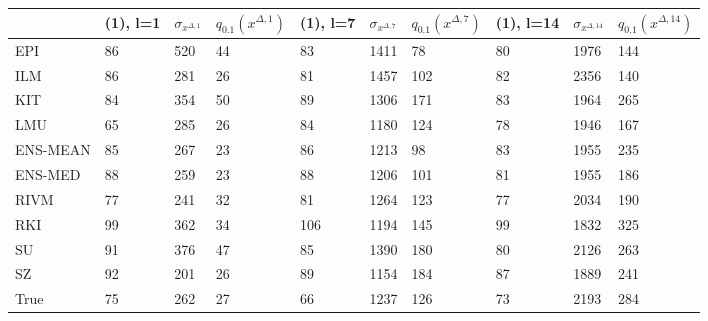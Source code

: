 \begin{tabularx}{\textwidth}{Xlllllllll}
\toprule
 & (1), l=1 & $\sigma_{x^{\Delta, 1}}$ & $q_{0.1} (x^{\Delta, 1})$ & (1), l=7 & $\sigma_{x^{\Delta, 7}}$ & $q_{0.1} (x^{\Delta, 7})$ & (1), l=14 & $\sigma_{x^{\Delta, 14}}$ & $q_{0.1} (x^{\Delta, 14})$ \\
\midrule
EPI & 86 & 520 & 44 & 83 & 1411 & 78 & 80 & 1976 & 144 \\
ILM & 86 & 281 & 26 & 81 & 1457 & 102 & 82 & 2356 & 140 \\
KIT & 84 & 354 & 50 & 89 & 1306 & 171 & 83 & 1964 & 265 \\
LMU & 65 & 285 & 26 & 84 & 1180 & 124 & 78 & 1946 & 167 \\
ENS-MEAN & 85 & 267 & 23 & 86 & 1213 & 98 & 83 & 1955 & 235 \\
ENS-MED & 88 & 259 & 23 & 88 & 1206 & 101 & 81 & 1955 & 186 \\
RIVM & 77 & 241 & 32 & 81 & 1264 & 123 & 77 & 2034 & 190 \\
RKI & 99 & 362 & 34 & 106 & 1194 & 145 & 99 & 1832 & 325 \\
SU & 91 & 376 & 47 & 85 & 1390 & 180 & 80 & 2126 & 263 \\
SZ & 92 & 201 & 26 & 89 & 1154 & 184 & 87 & 1889 & 241 \\
True & 75 & 262 & 27 & 66 & 1237 & 126 & 73 & 2193 & 284 \\
\bottomrule
\end{tabularx}
